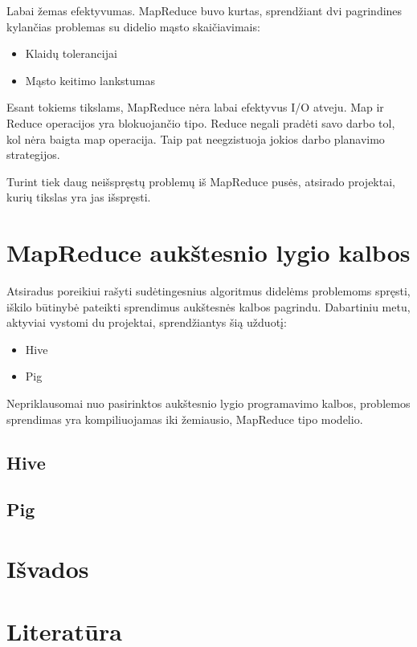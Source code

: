 \documentclass[10pt]{IEEEtran}
\begin{document}
		Labai žemas efektyvumas. MapReduce buvo kurtas, sprendžiant dvi pagrindines kylančias problemas su didelio mąsto skaičiavimais:

		\begin{itemize}
			\item Klaidų tolerancijai
			\item Mąsto keitimo lankstumas
		\end{itemize}

		Esant tokiems tikslams, MapReduce nėra labai efektyvus I/O atveju. Map ir Reduce operacijos yra blokuojančio tipo. Reduce negali pradėti savo darbo tol, kol nėra baigta map operacija. Taip pat neegzistuoja jokios darbo planavimo strategijos.

		Turint tiek daug neišspręstų problemų iš MapReduce pusės, atsirado projektai, kurių tikslas yra jas išspręsti.

	\section{MapReduce aukštesnio lygio kalbos}

		Atsiradus poreikiui rašyti sudėtingesnius algoritmus didelėms problemoms spręsti, iškilo būtinybė pateikti sprendimus aukštesnės kalbos pagrindu. Dabartiniu metu, aktyviai vystomi du projektai, sprendžiantys šią užduotį:

		\begin{itemize}
			\item Hive
			\item Pig
		\end{itemize}

		Nepriklausomai nuo pasirinktos aukštesnio lygio programavimo kalbos, problemos sprendimas yra kompiliuojamas iki žemiausio, MapReduce tipo modelio.

		\subsection{Hive}

			

		\subsection{Pig}


	\section{Išvados}

	\section{Literatūra}

		
		
\end{document}
